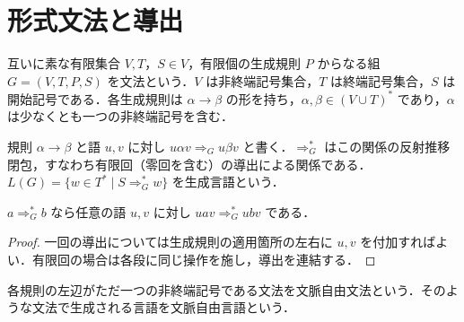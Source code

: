 \section{形式文法と導出}
\begin{defn}[形式文法]
互いに素な有限集合 $V,T$，$S\in V$，有限個の生成規則 $P$ からなる組 $G=(V,T,P,S)$ を文法という．$V$ は非終端記号集合，$T$ は終端記号集合，$S$ は開始記号である．各生成規則は $\alpha\to\beta$ の形を持ち，$\alpha,\beta\in(V\cup T)^*$ であり，$\alpha$ は少なくとも一つの非終端記号を含む．
\end{defn}
\begin{defn}[導出と生成言語]
規則 $\alpha\to\beta$ と語 $u,v$ に対し $u\alpha v\Rightarrow_G u\beta v$ と書く．$\Rightarrow_G^*$ はこの関係の反射推移閉包，すなわち有限回（零回を含む）の導出による関係である．$L(G)=\{w\in T^*\mid S\Rightarrow_G^*w\}$ を生成言語という．
\end{defn}
\begin{prop}[導出の文脈に関する閉性]
$a\Rightarrow_G^*b$ なら任意の語 $u,v$ に対し $uav\Rightarrow_G^*ubv$ である．
\end{prop}
\begin{proof}
一回の導出については生成規則の適用箇所の左右に $u,v$ を付加すればよい．有限回の場合は各段に同じ操作を施し，導出を連結する．
\end{proof}
\begin{defn}[文脈自由文法]
各規則の左辺がただ一つの非終端記号である文法を文脈自由文法という．そのような文法で生成される言語を文脈自由言語という．
\end{defn}
